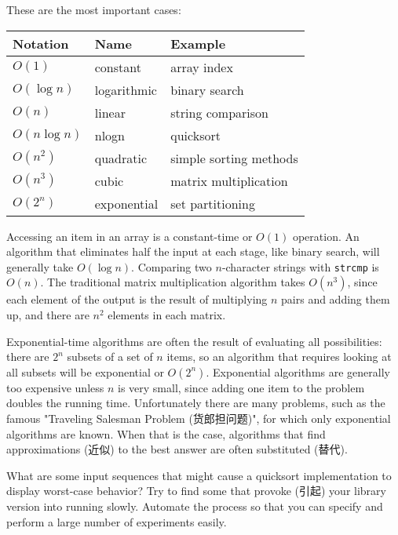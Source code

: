 These are the most important cases:
\begin{center}
\begin{tabular}{lll}
Notation        & Name          & Example                   \\
\hline
$O(1)$          & constant      & array index               \\
$O(\log n)$     & logarithmic   & binary search             \\
$O(n)$          & linear        & string comparison         \\
$O(n\log n)$    & nlogn         & quicksort                 \\
$O(n^2)$        & quadratic     & simple sorting methods    \\
$O(n^3)$        & cubic         & matrix multiplication     \\
$O(2^n)$        & exponential   & set partitioning
\end{tabular}
\end{center}

Accessing an item in an array is a constant-time or $O(1)$ operation. An
algorithm that eliminates half the input at each stage, like binary search,
will generally take $O(\log n)$. Comparing two $n$-character strings with
\verb'strcmp' is $O(n)$. The traditional matrix multiplication algorithm
takes $O(n^3)$, since each element of the output is the result of
multiplying $n$ pairs and adding them up, and there are $n^2$ elements in
each matrix.

Exponential-time algorithms are often the result of evaluating all
possibilities: there are $2^n$ subsets of a set of $n$ items, so an
algorithm that requires looking at all subsets will be exponential or
$O(2^n)$. Exponential algorithms are generally too expensive unless $n$ is
very small, since adding one item to the problem doubles the running time.
Unfortunately there are many problems, such as the famous "Traveling
Salesman Problem (货郎担问题)", for which only exponential algorithms are
known. When that is the case, algorithms that find approximations (近似) to
the best answer are often substituted (替代).

\begin{exercise}
What are some input sequences that might cause a quicksort implementation
to display worst-case behavior? Try to find some that provoke (引起) your
library version into running slowly. Automate the process so that you can
specify and perform a large number of experiments easily.
\end{exercise}

